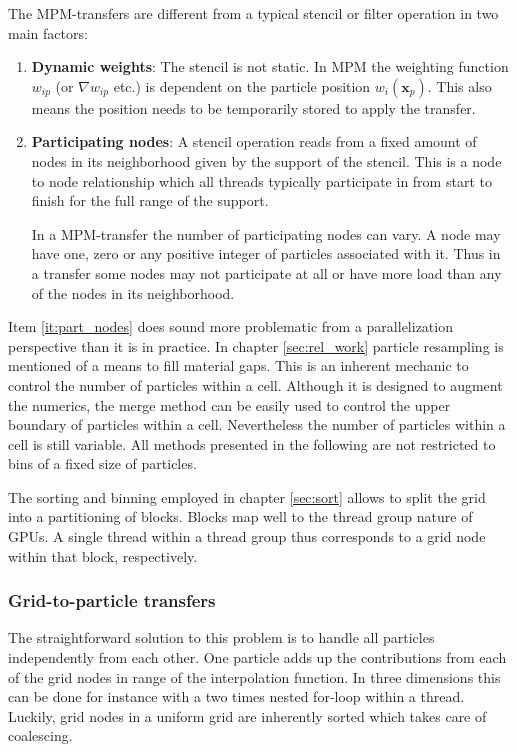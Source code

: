 \documentclass[m,times]{cgMA}
\begin{document}
The MPM-transfers are different from a typical stencil or filter operation in two main factors:
\begin{enumerate}
  \item \textbf{Dynamic weights}: The stencil is not static. In MPM the weighting function $w_{ip}$ (or $\nabla w_{ip}$ etc.) is dependent on the particle position $w_i(\boldsymbol{x}_p)$. This also means the position needs to be temporarily stored to apply the transfer.
  \item \label{it:part_nodes} \textbf{Participating nodes}: A stencil operation reads from a fixed amount of nodes in its neighborhood given by the support of the stencil. This is a node to node relationship which all threads typically participate in from start to finish for the full range of the support.

In a MPM-transfer the number of participating nodes can vary. A node may have one, zero or any positive integer of particles associated with it. Thus in a transfer some nodes may not participate at all or have more load than any of the nodes in its neighborhood.
\end{enumerate}
Item \ref{it:part_nodes} does sound more problematic from a parallelization perspective than it is in practice. In chapter \ref{sec:rel_work} particle resampling is mentioned of a means to fill material gaps. This is an inherent mechanic to control the number of particles within a cell. Although it is designed to augment the numerics, the merge method can be easily used to control the upper boundary of particles within a cell. Nevertheless the number of particles within a cell is still variable. All methods presented in the following are not restricted to bins of a fixed size of particles.

The sorting and binning employed in chapter \ref{sec:sort} allows to split the grid into a partitioning of blocks. Blocks map well to the thread group nature of GPUs. A single thread within a thread group thus corresponds to a grid node within that block, respectively.

\subsubsection{Grid-to-particle transfers}\label{sec:g2p}
The straightforward solution to this problem is to handle all particles independently from each other. One particle adds up the contributions from each of the grid nodes in range of the interpolation function. In three dimensions this can be done for instance with a two times nested for-loop within a thread. Luckily, grid nodes in a uniform grid are inherently sorted which takes care of coalescing.
\end{document}
